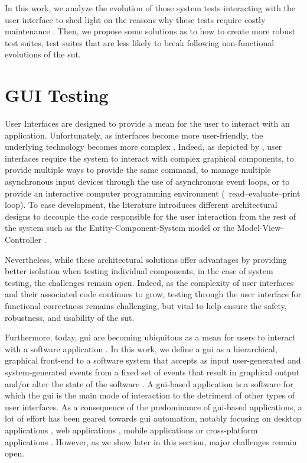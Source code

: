 In this work, we analyze the evolution of those system tests interacting with the user interface to shed light on the reasons why these tests require costly maintenance \cite{Alegroth2016, Coppola2020}. Then, we propose some solutions as to how to create more robust test suites, \ie test suites that are less likely to break following non-functional evolutions of the \gls{sut}.

\section{GUI Testing}
\label{sec:introduction-gui-testing}

User Interfaces are designed to provide a mean for the user to interact with an application. Unfortunately, as interfaces become more user-friendly, the underlying technology becomes more complex \cite{Myers1994}. Indeed, as depicted by \textcite{Myers1995}, user interfaces require the system to  interact with complex graphical components, to provide multiple ways to provide the same command, to manage multiple asynchronous input devices through the use of asynchronous event loops, or to provide an interactive computer programming environment (\eg\ read–evaluate–print loop). To ease development, the literature introduces different architectural designs to decouple the code responsible for the user interaction from the rest of the system such as the Entity-Component-System model \cite{Raffaillac2018} or the Model-View-Controller \cite{Krasner1988}.

Nevertheless, while these architectural solutions offer advantages by providing better isolation when testing individual components, in the case of system testing, the challenges remain open. Indeed, as the complexity of user interfaces and their associated code continues to grow, testing through the user interface for functional correctness remains challenging, but vital to help ensure the safety, robustness, and usability of the \gls{sut}.

Furthermore, today, \gls{gui} are becoming ubiquitous as a mean for users to interact with a software application \cite{Myers1992, Myers1995, Brooks2009, Memon2010}. In this work, we define a \gls{gui} as a hierarchical, graphical front-end to a software system that accepts as input user-generated and system-generated events from a fixed set of events that result in graphical output \cite{Memon2007} and/or alter the state of the software \cite{Nguyen2014}. A \gls{gui}-based application is a software for which the \gls{gui} is the main mode of interaction to the detriment of other types of user interfaces. As a consequence of the predominance of \gls{gui}-based applications, a lot of effort has been geared towards \gls{gui} automation, notably focusing on desktop applications \cite{Nguyen2014, Advolodkin2018, Pezze2018}, web applications \cite{Mesbah2009, Biagiola2019}, mobile applications \cite{Machiry2013, Gomez2013, Mao2016, Salihu2019, Yu2019} or cross-platform applications \cite{Canny2020}. However, as we show later in this section, major challenges remain open.

